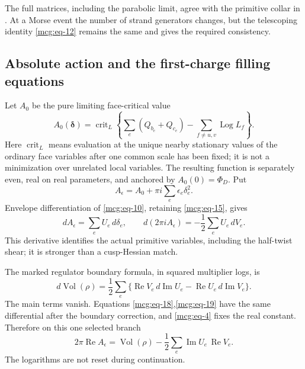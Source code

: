 The full matrices, including the parabolic limit, agree with the
primitive collar in \cite[Section~4]{MarkedFillings}. At a Morse event
the number of strand generators changes, but the telescoping identity
\eqref{mcg:eq-12} remains the same and gives the required consistency.

\subsection{Absolute action and the first-charge filling
equations}\label{mcg:sec-6}

Let \(A_0\) be the pure limiting face-critical value \begin{equation}\label{mcg:eq-17}
A_0(\boldsymbol\delta)=
 \operatorname{crit}_{L}
 \left\{\sum_e(Q_{b_e}+Q_{c_e})
                -\sum_{f\ne u,v}\operatorname{Log}L_f\right\}.
\end{equation} Here $\operatorname{crit}_L$ means evaluation at the unique nearby
stationary values of the ordinary face variables after one common scale
has been fixed; it is not a minimization over unrelated local variables.
The resulting function is separately even, real on real parameters,
and anchored by
\(A_0(0)=\Phi_D\). Put \[
 A_\epsilon=A_0+\pi i\sum_e\epsilon_e\delta_e^2.
\] Envelope differentiation of \eqref{mcg:eq-10}, retaining
\eqref{mcg:eq-15}, gives \begin{equation}\label{mcg:eq-18}
dA_\epsilon=\sum_e U_e\,d\delta_e,\qquad
       d(2\pi i A_\epsilon)=-\frac12\sum_e U_e\,dV_e.
\end{equation} This derivative identifies the actual primitive variables, including
the half-twist shear; it is stronger than a cusp-Hessian match.

The marked regulator boundary formula, in squared multiplier logs, is \begin{equation}\label{mcg:eq-19}
d\operatorname{Vol}(\rho)
   =\frac12\sum_e
       \{\operatorname{Re}V_e\,d\operatorname{Im}U_e
           -\operatorname{Re}U_e\,d\operatorname{Im}V_e\}.
\end{equation} The main terms vanish. Equations \eqref{mcg:eq-18},\eqref{mcg:eq-19}
have the same differential after the boundary correction, and
\eqref{mcg:eq-4} fixes the real constant. Therefore on this one selected
branch \begin{equation}\label{mcg:eq-20}
2\pi\operatorname{Re}A_\epsilon
   =\operatorname{Vol}(\rho)
        -\frac12\sum_e
                \operatorname{Im}U_e\,\operatorname{Re}V_e.
\end{equation} The logarithms are not reset during continuation.

